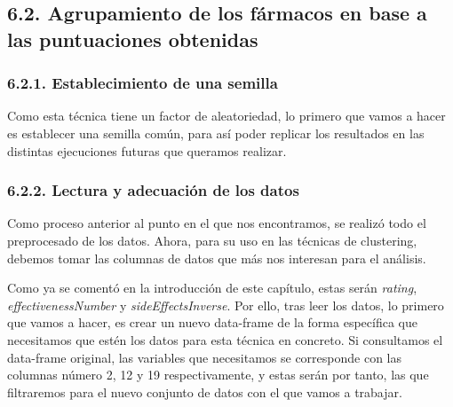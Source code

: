 \documentclass[spanish,]{article}
\begin{document}
\subsection{6.2. Agrupamiento de los fármacos en base a las puntuaciones
obtenidas}\label{agrupamiento-de-los-farmacos-en-base-a-las-puntuaciones-obtenidas}

\subsubsection{6.2.1. Establecimiento de una
semilla}\label{establecimiento-de-una-semilla}

Como esta técnica tiene un factor de aleatoriedad, lo primero que vamos
a hacer es establecer una semilla común, para así poder replicar los
resultados en las distintas ejecuciones futuras que queramos realizar.

\subsubsection{6.2.2. Lectura y adecuación de los
datos}\label{lectura-y-adecuacion-de-los-datos}

Como proceso anterior al punto en el que nos encontramos, se realizó
todo el preprocesado de los datos. Ahora, para su uso en las técnicas de
clustering, debemos tomar las columnas de datos que más nos interesan
para el análisis.

Como ya se comentó en la introducción de este capítulo, estas serán
\emph{rating}, \emph{effectivenessNumber} y \emph{sideEffectsInverse}.
Por ello, tras leer los datos, lo primero que vamos a hacer, es crear un
nuevo data-frame de la forma específica que necesitamos que estén los
datos para esta técnica en concreto. Si consultamos el data-frame
original, las variables que necesitamos se corresponde con las columnas
número 2, 12 y 19 respectivamente, y estas serán por tanto, las que
filtraremos para el nuevo conjunto de datos con el que vamos a trabajar.
\end{document}
